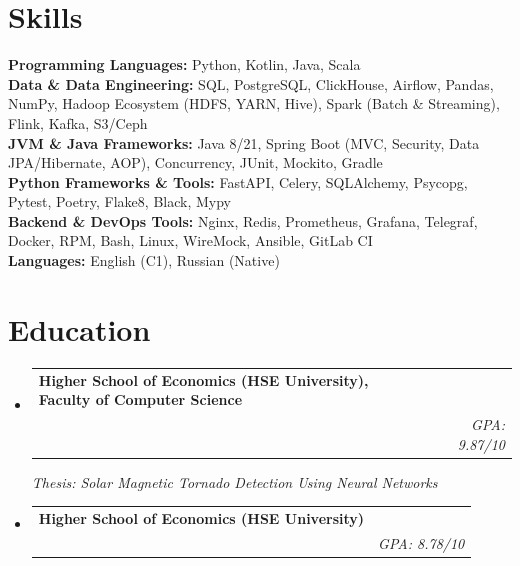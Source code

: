 \documentclass[letterpaper,11pt]{article}
\makeatletter
\newcommand{\resumeSubheading}[4]{
  \vspace{-4pt}\item
    \begin{tabular*}{0.97\textwidth}[t]{l@{\extracolsep{\fill}}r}
      \textbf{#1} & \normalfont{#2} \\[1pt]
      \normalfont{#3} & \textit{#4} \\
    \end{tabular*}\vspace{-4pt}
}
\newcommand{\resumeSubHeadingListStart}{\begin{itemize}[leftmargin=0.15in, label={}]}
\newcommand{\resumeSubHeadingListEnd}{\end{itemize}}
\newcommand{\resumeItemListStart}{\begin{itemize}}
\newcommand{\resumeItemListEnd}{\end{itemize}}
\makeatother
\begin{document}
\section{Skills}
  \resumeSubHeadingListStart
    \small{\item{
        \textbf{Programming Languages:}{ Python, Kotlin, Java, Scala } \\ \vspace*{3pt}
        \textbf{Data \& Data Engineering:}{ SQL, PostgreSQL, ClickHouse, Airflow, Pandas, NumPy, Hadoop Ecosystem (HDFS, YARN, Hive), Spark (Batch \& Streaming), Flink, Kafka, S3/Ceph } \\ \vspace*{3pt}
        \textbf{JVM \& Java Frameworks:}{ Java 8/21, Spring Boot (MVC, Security, Data JPA/Hibernate, AOP), Concurrency, JUnit, Mockito, Gradle } \\ \vspace*{3pt}
        \textbf{Python Frameworks \& Tools:}{ FastAPI, Celery, SQLAlchemy, Psycopg, Pytest, Poetry, Flake8, Black, Mypy } \\ \vspace*{3pt}
        \textbf{Backend \& DevOps Tools:}{ Nginx, Redis, Prometheus, Grafana, Telegraf, Docker, RPM, Bash, Linux, WireMock, Ansible, GitLab CI } \\ \vspace*{3pt}
        \textbf{Languages:}{ English (C1), Russian (Native) } \\
    }}
  \resumeSubHeadingListEnd

\section{Education}
  \resumeSubHeadingListStart

    \resumeSubheading
      {Higher School of Economics (HSE University), Faculty of Computer Science}{Sep 2023 -- Jun 2025}
      {Master's degree in Machine Learning and High Load Systems}{GPA: 9.87/10}
      \resumeItemListStart
        \vspace{0.2em}
        \textit{Thesis: \textit{Solar Magnetic Tornado Detection Using Neural Networks}}
      \resumeItemListEnd
      \vspace{-0.8em}
    \resumeSubheading
      {Higher School of Economics (HSE University)}{Sep 2019 -- Jun 2023}
      {Bachelor's degree in Economics}{GPA: 8.78/10}

  \resumeSubHeadingListEnd
\end{document}
